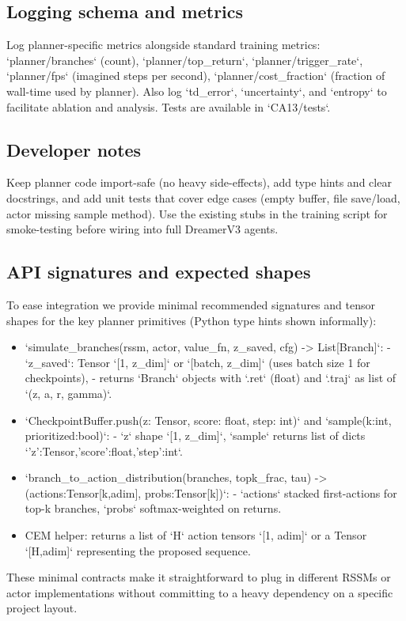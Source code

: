 \documentclass{article}
\begin{document}
\subsection{Logging schema and metrics}
Log planner-specific metrics alongside standard training metrics:
`planner/branches` (count), `planner/top_return`, `planner/trigger_rate`,
`planner/fps` (imagined steps per second), `planner/cost_fraction` (fraction of
wall-time used by planner). Also log `td_error`, `uncertainty`, and `entropy` to
facilitate ablation and analysis. Tests are available in `CA13/tests`.

\subsection{Developer notes}
Keep planner code import-safe (no heavy side-effects), add type hints and
clear docstrings, and add unit tests that cover edge cases (empty buffer,
file save/load, actor missing sample method). Use the existing stubs in the
training script for smoke-testing before wiring into full DreamerV3 agents.

\subsection{API signatures and expected shapes}
To ease integration we provide minimal recommended signatures and tensor shapes
for the key planner primitives (Python type hints shown informally):
\begin{itemize}
\item `simulate_branches(rssm, actor, value_fn, z_saved, cfg) -> List[Branch]`:
  - `z_saved`: Tensor `[1, z_dim]` or `[batch, z_dim]` (uses batch size 1 for checkpoints),
  - returns `Branch` objects with `.ret` (float) and `.traj` as list of `(z, a, r, gamma)`.
\item `CheckpointBuffer.push(z: Tensor, score: float, step: int)` and `sample(k:int, prioritized:bool)`:
  - `z` shape `[1, z_dim]`, `sample` returns list of dicts `{'z':Tensor,'score':float,'step':int}`.
\item `branch_to_action_distribution(branches, topk_frac, tau) -> (actions:Tensor[k,adim], probs:Tensor[k])`:
  - `actions` stacked first-actions for top-k branches, `probs` softmax-weighted on returns.
\item CEM helper: returns a list of `H` action tensors `[1, adim]` or a Tensor `[H,adim]` representing the proposed sequence.
\end{itemize}
These minimal contracts make it straightforward to plug in different RSSMs or
actor implementations without committing to a heavy dependency on a specific
project layout.
\end{document}
